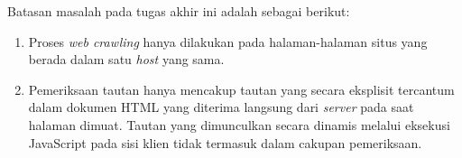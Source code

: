 Batasan masalah pada tugas akhir ini adalah sebagai berikut:

\begin{enumerate}
    \item Proses \textit{web crawling} hanya dilakukan pada halaman-halaman situs yang berada dalam satu \textit{host} yang sama.

    \item Pemeriksaan tautan hanya mencakup tautan yang secara eksplisit tercantum dalam dokumen HTML yang diterima langsung dari \textit{server} pada saat halaman dimuat. Tautan yang dimunculkan secara dinamis melalui eksekusi JavaScript pada sisi klien tidak termasuk dalam cakupan pemeriksaan.
\end{enumerate}